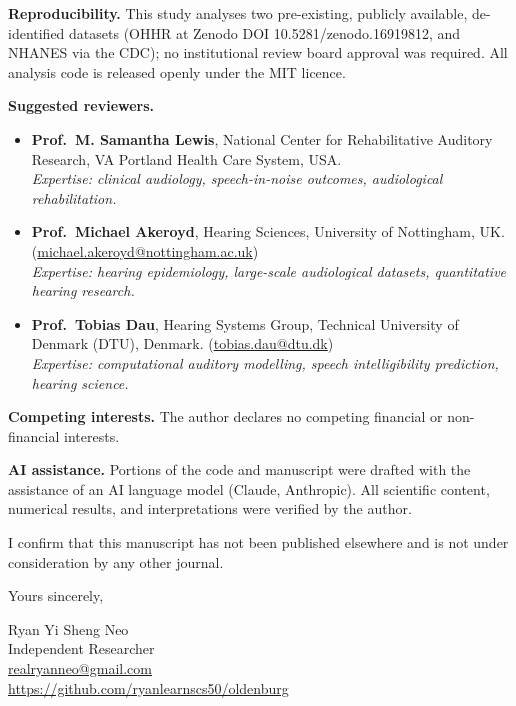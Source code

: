 \documentclass[12pt,a4paper]{article}
\begin{document}
\textbf{Reproducibility.}
This study analyses two pre-existing, publicly available, de-identified
datasets (OHHR at Zenodo DOI 10.5281/zenodo.16919812, and NHANES via the
CDC); no institutional review board approval was required.  All analysis code
is released openly under the MIT licence.

\textbf{Suggested reviewers.}
\begin{itemize}
  \item \textbf{Prof.\ M. Samantha Lewis}, National Center for Rehabilitative
        Auditory Research, VA Portland Health Care System, USA.\\
        \textit{Expertise: clinical audiology, speech-in-noise outcomes,
        audiological rehabilitation.}

  \item \textbf{Prof.\ Michael Akeroyd}, Hearing Sciences, University of
        Nottingham, UK.
        (\href{mailto:michael.akeroyd@nottingham.ac.uk}{michael.akeroyd@nottingham.ac.uk})\\
        \textit{Expertise: hearing epidemiology, large-scale audiological
        datasets, quantitative hearing research.}

  \item \textbf{Prof.\ Tobias Dau}, Hearing Systems Group, Technical
        University of Denmark (DTU), Denmark.
        (\href{mailto:tobias.dau@dtu.dk}{tobias.dau@dtu.dk})\\
        \textit{Expertise: computational auditory modelling, speech
        intelligibility prediction, hearing science.}
\end{itemize}

\textbf{Competing interests.}
The author declares no competing financial or non-financial interests.

\textbf{AI assistance.}
Portions of the code and manuscript were drafted with the assistance of an
AI language model (Claude, Anthropic).  All scientific content, numerical
results, and interpretations were verified by the author.

I confirm that this manuscript has not been published elsewhere and is not
under consideration by any other journal.

Yours sincerely,

\bigskip
Ryan Yi Sheng Neo\\
Independent Researcher\\
\href{mailto:realryanneo@gmail.com}{realryanneo@gmail.com}\\
\url{https://github.com/ryanlearnscs50/oldenburg}
\end{document}
